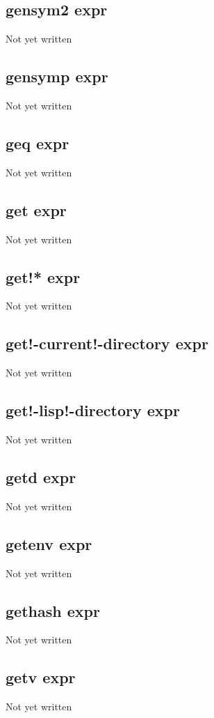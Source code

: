 \documentclass[a4paper,11pt]{article}
\begin{document}
\subsection{\ttfamily gensym2 expr}
Not yet written

\subsection{\ttfamily gensymp expr}
Not yet written

\subsection{\ttfamily geq expr}
Not yet written

\subsection{\ttfamily get expr}
Not yet written

\subsection{\ttfamily get!* expr}
Not yet written

\subsection{\ttfamily get!-current!-directory expr}
Not yet written

\subsection{\ttfamily get!-lisp!-directory expr}
Not yet written

\subsection{\ttfamily getd expr}
Not yet written

\subsection{\ttfamily getenv expr}
Not yet written

\subsection{\ttfamily gethash expr}
Not yet written

\subsection{\ttfamily getv expr}
Not yet written
\end{document}
